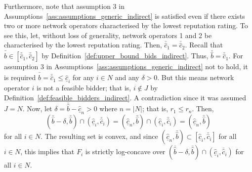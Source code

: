 Furthermore, note that assumption 3 in Assumptions~\ref{ass:assumptions_generic_indirect} is satisfied even if there exists two or more network operators characterised by the lowest reputation rating. To see this, let, without loss of generality, network operators 1 and 2 be characterised by the lowest reputation rating. Then, $\bar{\hat{c}}_1 = \bar{\hat{c}}_2$. Recall that $\bar{\hat{b}}\in [\bar{\hat{c}}_1, \bar{\hat{c}}_2]$ by Definition~\ref{def:upper_bound_bids_indirect}. Thus, $\bar{\hat{b}} = \bar{\hat{c}}_1$. For assumption 3 in Assumptions~\ref{ass:assumptions_generic_indirect} not to hold, it is required $\bar{\hat{b}} = \bar{\hat{c}}_1 \leq \underline{\hat{c}}_i$ for any $i\in N$ and any $\delta>0$. But this means network operator $i$ is not a feasible bidder; that is, $i\not\in J$ by Definition~\ref{def:feasible_bidders_indirect}. A contradiction since it was assumed $J = N$. Now, let $\delta = \bar{\hat{b}} - \underline{\hat{c}}_n > 0$ where $n = |N|$; that is, $r_1\leq r_n$. Then,
\begin{equation}
(\bar{\hat{b}}-\delta, \bar{\hat{b}})\cap (\underline{\hat{c}}_i, \bar{\hat{c}}_i) = (\underline{\hat{c}}_n, \bar{\hat{b}})\cap (\underline{\hat{c}}_i, \bar{\hat{c}}_i) = (\underline{\hat{c}}_n, \bar{\hat{b}})
\end{equation}
for all $i\in N$. The resulting set is convex, and since $(\underline{\hat{c}}_n, \bar{\hat{b}})\subset [\underline{\hat{c}}_i, \bar{\hat{c}}_i]$ for all $i\in N$, this implies that $F_i$ is strictly log-concave over $(\bar{\hat{b}}-\delta, \bar{\hat{b}})\cap (\underline{\hat{c}}_i, \bar{\hat{c}}_i)$ for all $i\in N$.

